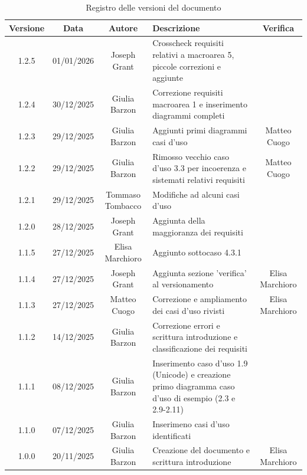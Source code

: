 \documentclass[11pt,a4paper]{article}
\begin{document}
\begin{table}[H]
    \centering
    \begin{tabular}{|c|c|c|>{\raggedright\arraybackslash}p{}|c|}
        \hline
        \textbf{Versione} & \textbf{Data} & \textbf{Autore} & \textbf{Descrizione} & \textbf{Verifica} \\
        \hline
        1.2.5 & 01/01/2026 & Joseph Grant & Crosscheck requisiti relativi a macroarea 5, piccole correzioni e aggiunte &  \\
        \hline
        1.2.4 & 30/12/2025 & Giulia Barzon & Correzione requisiti macroarea 1 e inserimento diagrammi completi &  \\
        \hline
        1.2.3 & 29/12/2025 & Giulia Barzon & Aggiunti primi diagrammi casi d'uso &  Matteo Cuogo \\
        \hline
        1.2.2 & 29/12/2025 & Giulia Barzon & Rimosso vecchio caso d'uso 3.3 per incoerenza e sistemati relativi requisiti & Matteo Cuogo \\
        \hline
        1.2.1 & 29/12/2025 & Tommaso Tombacco & Modifiche ad alcuni casi d'uso &  \\ 
        \hline
        1.2.0 & 28/12/2025 & Joseph Grant & Aggiunta della maggioranza dei requisiti &  \\ 
        \hline
        1.1.5 & 27/12/2025 & Elisa Marchioro & Aggiunto sottocaso 4.3.1 & \\ 
        \hline
        1.1.4 & 27/12/2025 & Joseph Grant & Aggiunta sezione 'verifica' al versionamento & Elisa Marchioro\\ 
        \hline
        1.1.3 & 27/12/2025 & Matteo Cuogo & Correzione e ampliamento dei casi d'uso rivisti & Elisa Marchioro\\
        \hline
        1.1.2 & 14/12/2025 & Giulia Barzon & Correzione errori e scrittura introduzione e classificazione dei requisiti &\\
        \hline
        1.1.1 & 08/12/2025 & Giulia Barzon & Inserimento caso d'uso 1.9 (Unicode) e creazione primo diagramma caso d'uso di esempio (2.3 e 2.9-2.11) &\\
        \hline
        1.1.0 & 07/12/2025 & Giulia Barzon & Inserimeno casi d'uso identificati & \\
        \hline
        1.0.0 & 20/11/2025 & Giulia Barzon & Creazione del documento e scrittura introduzione & Elisa Marchioro\\
        \hline
    \end{tabular}
    \caption{Registro delle versioni del documento}
    \label{tab:versionamento}
\end{table}
\end{document}
